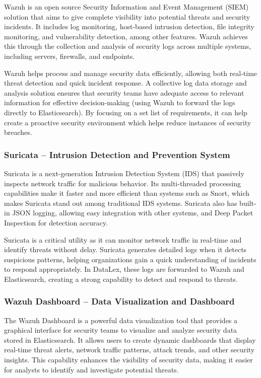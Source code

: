 Wazuh is an open source Security Information and Event Management (SIEM) solution that aims to give complete visibility into potential threats and security incidents. It includes log monitoring, host-based intrusion detection, file integrity monitoring, and vulnerability detection, among other features. Wazuh achieves this through the collection and analysis of security logs across multiple systems, including servers, firewalls, and endpoints.

Wazuh helps process and manage security data efficiently, allowing both real-time threat detection and quick incident response. A collective log data storage and analysis solution ensures that security teams have adequate access to relevant information for effective decision-making (using Wazuh to forward the logs directly to Elasticsearch). By focusing on a set list of requirements, it can help create a proactive security environment which helps reduce instances of security breaches.

\subsubsection{Suricata -- Intrusion Detection and Prevention System}
\label{subsubsec_suricata}

Suricata is a next-generation Intrusion Detection System (IDS) that passively inspects network traffic for malicious behavior. Its multi-threaded processing capabilities make it faster and more efficient than systems such as Snort, which makes Suricata stand out among traditional IDS systems. Suricata also has built-in JSON logging, allowing easy integration with other systems, and Deep Packet Inspection for detection accuracy.

Suricata is a critical utility as it can monitor network traffic in real-time and identify threats without delay. Suricata generates detailed logs when it detects suspicious patterns, helping organizations gain a quick understanding of incidents to respond appropriately. In DataLex, these logs are forwarded to Wazuh and Elasticsearch, creating a strong capability to detect and respond to threats.

\subsubsection{Wazuh Dashboard -- Data Visualization and Dashboard}
\label{subsubsec_wazuh_dashboard}

The Wazuh Dashboard is a powerful data visualization tool that provides a graphical interface for security teams to visualize and analyze security data stored in Elasticsearch. It allows users to create dynamic dashboards that display real-time threat alerts, network traffic patterns, attack trends, and other security insights. This capability enhances the visibility of security data, making it easier for analysts to identify and investigate potential threats.

